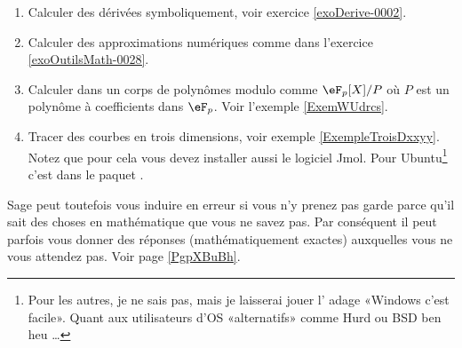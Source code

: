 \begin{enumerate}
	\item
		Calculer des dérivées symboliquement, voir exercice \ref{exoDerive-0002}.
	\item
		Calculer des approximations numériques comme dans l'exercice \ref{exoOutilsMath-0028}.
    \item
        Calculer dans un corps de polynômes modulo comme \( \eF_p[X]/P\) où \( P\) est un polynôme à coefficients dans \( \eF_p\). Voir l'exemple \ref{ExemWUdrcs}.
	\item
        Tracer des courbes en trois dimensions, voir exemple \ref{ExempleTroisDxxyy}. Notez que pour cela vous devez installer aussi le logiciel Jmol. Pour Ubuntu\footnote{Pour les autres, je ne sais pas, mais je laisserai jouer l' adage «Windows c'est facile». Quant aux utilisateurs d'OS «alternatifs» comme Hurd ou BSD ben heu \ldots} c'est dans le paquet .
\end{enumerate}

Sage peut toutefois vous induire en erreur si vous n'y prenez pas garde parce qu'il sait des choses en mathématique que vous ne savez pas. Par conséquent il peut parfois vous donner des réponses (mathématiquement exactes) auxquelles vous ne vous attendez pas. Voir page \ref{PgpXBuBh}.


